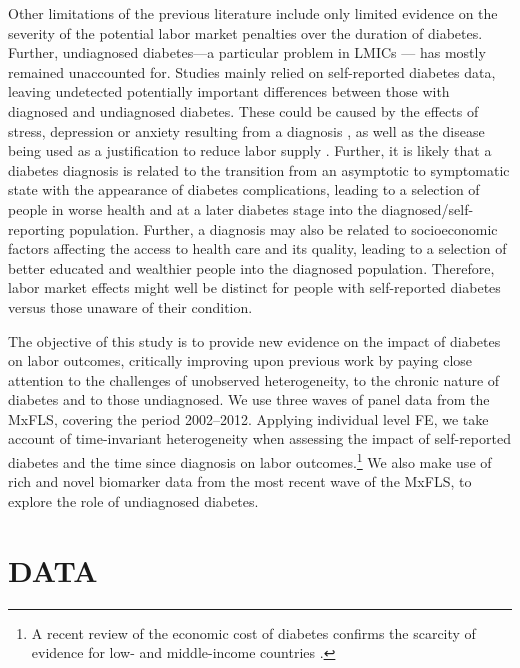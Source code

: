 \documentclass[12pt,english]{article}
\begin{document}
Other limitations of the previous literature include only limited evidence on the severity of the potential labor market penalties over the duration of diabetes. Further, undiagnosed diabetes---a particular problem in \acp{LMIC} \parencite{Beagley2014}--- has mostly remained unaccounted for. Studies mainly relied on self-reported diabetes data, leaving undetected potentially important differences between those with diagnosed and undiagnosed diabetes. These could be caused by the effects of stress, depression or anxiety resulting from a diagnosis \parencite{Liu2014}, as well as the disease being used as a justification to reduce labor supply \parencite{Kapteyn2009}. Further, it is likely that a diabetes diagnosis is related to the transition from an asymptotic to symptomatic state with the  appearance of diabetes complications, leading to a selection of people in worse health and at a later diabetes stage into the diagnosed/self-reporting population. Further, a diagnosis may also be related to socioeconomic factors affecting the access to health care and its quality, leading to a selection of better educated and wealthier people into the diagnosed population. Therefore, labor market effects might well be distinct for people with self-reported diabetes versus those unaware of their condition.

The objective of this study is to provide new evidence on the impact of diabetes on labor outcomes, critically improving upon previous work by paying close attention to the challenges of unobserved heterogeneity, to the chronic nature of diabetes and to those undiagnosed. We use three waves of panel data from the \acf{MxFLS}, covering the period 2002--2012. Applying individual level \acf{FE}, we take account of time-invariant heterogeneity when assessing the impact of self-reported diabetes and the time since diagnosis on labor outcomes.\footnote{A recent review of the economic cost of diabetes confirms the scarcity of evidence for low- and middle-income countries \parencite{Seuring2015a}.} We also make use of rich and novel biomarker data from the most recent wave of the \ac{MxFLS}, to explore the role of undiagnosed diabetes.

\section{\label{sec:Data}DATA}
\end{document}
